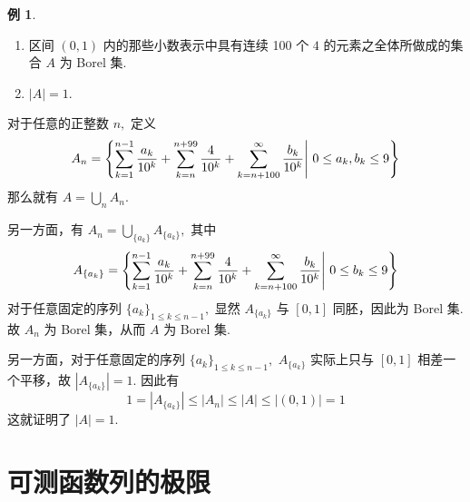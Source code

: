 \documentclass[12pt, a4paper, oneside]{book}
\numberwithin{figure}{section}
\theoremstyle{definition}
\newtheorem{example}[theorem]{例}
\begin{document}
\begin{example}
    \begin{enumerate}[label=\alph*)]
        \item 区间 $(0,1)$ 内的那些小数表示中具有连续 100 个 $4$ 的元素之全体所做成的集合 $A$ 为 Borel 集.
        \item $|A|=1.$
    \end{enumerate}
\end{example}

对于任意的正整数 $n,$ 定义 
\begin{equation}
    A_n=\left\{\sum_{k=1}^{n-1}{a_k\over 10^k}+\sum_{k=n}^{n+99} {4\over 10^k}+\sum_{k=n+100}^\infty {b_k\over 10^k}\Bigg|\ 0\leq a_k,b_k\leq 9\right\}
\end{equation}
那么就有 $A=\bigcup_n A_n.$ 

另一方面，有
$A_n=\bigcup_{\{a_k\}}A_{\{a_k\}},$ 其中 
\begin{equation}
    A_{\{a_k\}}=\left\{\sum_{k=1}^{n-1}{a_k\over 10^k}+\sum_{k=n}^{n+99} {4\over 10^k}+\sum_{k=n+100}^\infty {b_k\over 10^k}\Bigg|\ 0\leq b_k\leq 9\right\}
\end{equation}
对于任意固定的序列 $\{a_k\}_{1\leq k\leq n-1},$ 显然 $A_{\{a_k\}}$ 与 $[0,1]$ 同胚，因此为 Borel 集. 故 $A_n$ 为 Borel 集，从而 $A$ 为 Borel 集.

另一方面，对于任意固定的序列 $\{a_k\}_{1\leq k\leq n-1},$ $A_{\{a_k\}}$ 实际上只与 $[0,1]$ 相差一个平移，故 $|A_{\{a_k\}}|=1.$ 因此有
\begin{equation}
    1=|A_{\{a_k\}}|\leq |A_n|\leq |A|\leq |(0,1)|=1
\end{equation}
这就证明了 $|A|=1.$

\section{可测函数列的极限}

\nocite{*}


\end{document}
